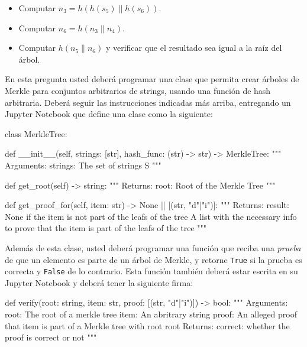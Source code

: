 \begin{itemize}
  \item Computar $n_3=h(h(s_5)\|h(s_6))$.
  \item Computar $n_6=h(n_3\|n_4)$.
  \item Computar $h(n_5\|n_6)$ y verificar que el resultado sea igual a la raíz del árbol.
\end{itemize}

En esta pregunta usted deberá programar una clase que permita crear árboles de Merkle para conjuntos arbitrarios de strings, usando una función de hash arbitraria. Deberá seguir las instrucciones indicadas más arriba, entregando un Jupyter Notebook que define una clase como la siguiente:

\bigskip
\begin{python}
  class MerkleTree:
    
    def __init__(self, strings: [str], hash_func: (str) -> str) -> MerkleTree:
    """
    Arguments:
      strings: The set of strings S
    """

    def get_root(self) -> string:
    """
    Returns:
      root: Root of the Merkle Tree
    """

    def get_proof_for(self, item: str) -> None || [(str, "d"|"i")]:
    """
    Returns:
      result: None if the item is not part of the leafs of the tree
              A list with the necessary info to prove that the
              item is part of the leafs of the tree
    """
\end{python}

Además de esta clase, usted deberá programar una función que reciba una \emph{prueba} de que un elemento es parte de un árbol de Merkle, y retorne \texttt{True} si la prueba es correcta y \texttt{False} de lo contrario. Esta función también deberá estar escrita en su Jupyter Notebook y deberá tener la siguiente firma:

\bigskip
\begin{python}
  def verify(root: string, item: str, proof: [(str, "d"|"i")]) -> bool:
    """
    Arguments:
      root: The root of a merkle tree
      item: An abritrary string
      proof: An alleged proof that item is part of a Merkle
             tree with root root
    Returns:
      correct: whether the proof is correct or not
    """
\end{python}
